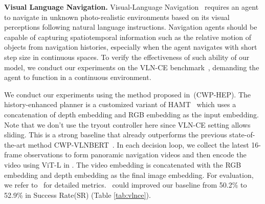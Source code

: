 \textbf{Visual Language Navigation.} 
Visual-Language Navigation~\cite{anderson2018vision} requires an agent to navigate in unknown photo-realistic environments based on its visual perceptions following natural language instructions. Navigation agents should be capable of capturing spatiotemporal information such as the relative motion of objects from navigation histories, especially when the agent navigates with short step size in continuous spaces. To verify the effectiveness of such ability of our model, we conduct our experiments on the VLN-CE benchmark~\cite{krantz2020beyond}, demanding the agent to function in a continuous environment.

We conduct our experiments using the method proposed in~\cite{an20221st}(CWP-HEP). The history-enhanced planner is a customized variant of HAMT~\cite{chen2021history} which uses a concatenation of depth embedding and RGB embedding as the input embedding. Note that we don't use the tryout controller here since VLN-CE setting allows sliding. This is a strong baseline that already outperforms the previous state-of-the-art method CWP-VLNBERT~\cite{hong2022bridging}. In each decision loop, we collect the latest 16-frame observations to form panoramic navigation videos and then encode the video using ViT-L in \model. The video embedding is concatenated with the RGB embedding and depth embedding as the final image embedding. For evaluation, we refer to~\cite{an20221st} for detailed metrics. \model~could improved our baseline from 50.2\% to 52.9\% in Success Rate(SR) (Table \ref{tab:vlnce}).